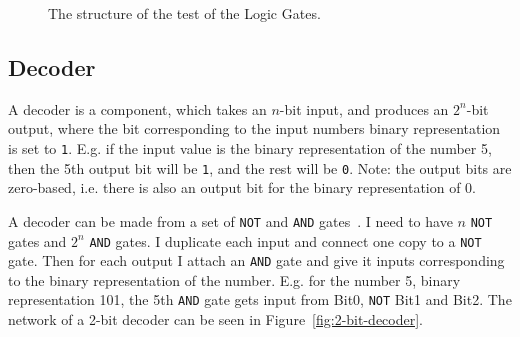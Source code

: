 \begin{figure}
    \centering
    \caption{The structure of the test of the Logic Gates.}
    \label{fig:logic-test}
\end{figure}

\subsection{Decoder}
A decoder is a component, which takes an $n$-bit input, and produces an
$2^n$-bit output, where the bit corresponding to the input numbers binary
representation is set to \texttt{1}. E.g. if the input value is the binary
representation of the number 5, then the 5th output bit will be \texttt{1}, and
the rest will be \texttt{0}. Note: the output bits are zero-based, i.e.
there is also an output bit for the binary representation of 0.

A decoder can be made from a set of \texttt{NOT} and \texttt{AND}
gates~\cite{ref:logic}. I need to have $n$ \texttt{NOT} gates and $2^n$
\texttt{AND} gates. I duplicate each input and connect one copy to
a \texttt{NOT} gate. Then for each output I attach an \texttt{AND} gate and
give it inputs corresponding to the binary representation of the number.
E.g. for the number 5, binary representation 101, the 5th \texttt{AND}
gate gets input from Bit0, \texttt{NOT} Bit1 and Bit2. The network of a 2-bit
decoder can be seen in Figure~\ref{fig:2-bit-decoder}.

